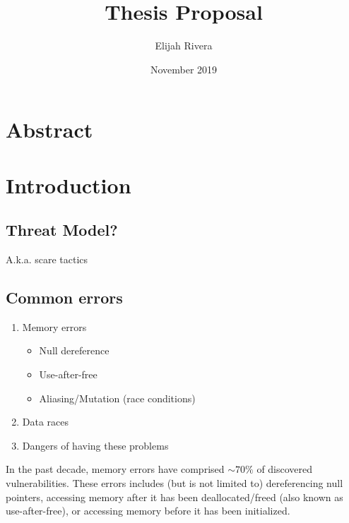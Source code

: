\documentclass{article}
\title{Thesis Proposal}
\author{Elijah Rivera}
\date{November 2019}
\begin{document}
\maketitle

\section{Abstract}

\section{Introduction}

\subsection{Threat Model?}
A.k.a. scare tactics

\subsection{Common errors}

\begin{enumerate}
    \item Memory errors
        \begin{itemize}
            \item Null dereference
            \item Use-after-free
            \item Aliasing/Mutation (race conditions)
        \end{itemize}
    \item Data races
    \item Dangers of having these problems
\end{enumerate}

In the past decade, memory errors have comprised $\sim70\%$ of discovered vulnerabilities. These errors includes (but is not limited to) dereferencing null pointers, accessing memory after it has been deallocated/freed (also known as use-after-free), or accessing memory before it has been initialized. 
\end{document}
